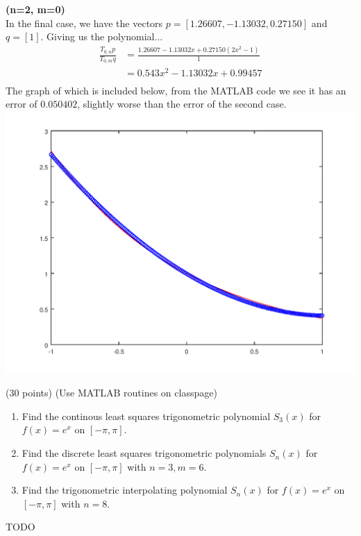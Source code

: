 \documentclass[10pt]{jhwhw}
\begin{document}
	\clearpage
	\textbf{(n=2, m=0)} \\
	In the final case, we have the vectors
	$p=[1.26607, -1.13032, 0.27150]$ and $q=[1]$.
	Giving us the polynomial... \\
	\begin{align*}
		\frac{T_{0,n}p}{T_{0,m}q} &= \frac{1.26607 - 1.13032x + 0.27150(2x^2-1)}{1} \\
		&= 0.543x^2 - 1.13032x + 0.99457 \\
	\end{align*}
	The graph of which is included below, from the MATLAB code we see it has an error
	of $0.050402$, slightly worse than the error of the second case.
	\includegraphics[scale=0.75]{p4c}

\problem{} (30 points) (Use MATLAB routines on classpage)

	\begin{enumerate}
		\item Find the continous least squares trigonometric polynomial $S_3(x)$ for
			$f(x) = e^x$ on $[-\pi,\pi]$.
		\item Find the discrete least squares trigonometric polynomials $S_n(x)$ for
			$f(x) = e^x$ on $[-\pi, \pi]$ with $n=3, m=6$.
		\item Find the trigonometric interpolating polynomial $S_n(x)$ for 
			$f(x) = e^x$ on $[-\pi, \pi]$ with $n=8$.
	\end{enumerate}

\solution

	TODO
\end{document}
